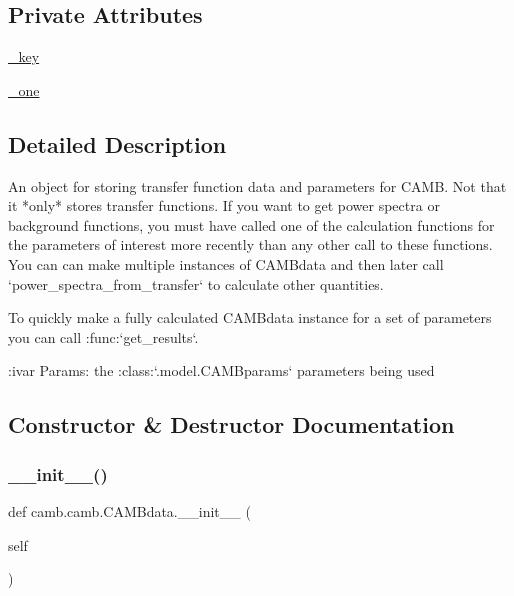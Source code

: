 \subsection*{Private Attributes}
\begin{DoxyCompactItemize}
\item 
\mbox{\hyperlink{classcamb_1_1camb_1_1CAMBdata_a2ba9e1f911e308e1b0d72bd203dc2f3f}{\+\_\+key}}
\item 
\mbox{\hyperlink{classcamb_1_1camb_1_1CAMBdata_ac2189ee12baa3a5b6efc08fe4628ecfc}{\+\_\+one}}
\end{DoxyCompactItemize}


\subsection{Detailed Description}
\begin{DoxyVerb}An object for storing transfer function data and parameters for CAMB.
Not that it *only* stores transfer functions. If you want to get power spectra or background functions,
you must have called one of the calculation functions for the parameters of interest more recently than
any other call to these functions. You can can make multiple instances of CAMBdata and then later call
`power_spectra_from_transfer` to calculate other quantities.

To quickly make a fully calculated CAMBdata instance for a set of parameters you can call :func:`get_results`.

:ivar Params: the :class:`.model.CAMBparams` parameters being used\end{DoxyVerb}
 

\subsection{Constructor \& Destructor Documentation}
\mbox{\label{classcamb_1_1camb_1_1CAMBdata_a778dd557d8b5cbab767da49bfd4676f5}} 
\subsubsection{\texorpdfstring{\+\_\+\+\_\+init\+\_\+\+\_\+()}{\_\_init\_\_()}}
{\footnotesize\ttfamily def camb.\+camb.\+C\+A\+M\+Bdata.\+\_\+\+\_\+init\+\_\+\+\_\+ (\begin{DoxyParamCaption}\item[{}]{self }\end{DoxyParamCaption})}

